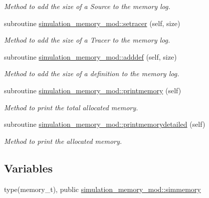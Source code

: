 \begin{DoxyCompactItemize}
\begin{DoxyCompactList}\small\item\em Method to add the size of a Source to the memory log. \end{DoxyCompactList}\item 
subroutine \mbox{\hyperlink{namespacesimulation__memory__mod_a3dfcc0936ad144d609a1b9f9a3a0df6f}{simulation\+\_\+memory\+\_\+mod\+::setracer}} (self, size)
\begin{DoxyCompactList}\small\item\em Method to add the size of a Tracer to the memory log. \end{DoxyCompactList}\item 
subroutine \mbox{\hyperlink{namespacesimulation__memory__mod_ac6d6853bc462947d24a8f6234d625138}{simulation\+\_\+memory\+\_\+mod\+::adddef}} (self, size)
\begin{DoxyCompactList}\small\item\em Method to add the size of a definition to the memory log. \end{DoxyCompactList}\item 
subroutine \mbox{\hyperlink{namespacesimulation__memory__mod_a16a7a1c7e88fe5a5523d23f83f0e04a0}{simulation\+\_\+memory\+\_\+mod\+::printmemory}} (self)
\begin{DoxyCompactList}\small\item\em Method to print the total allocated memory. \end{DoxyCompactList}\item 
subroutine \mbox{\hyperlink{namespacesimulation__memory__mod_a894bd4ec7462fd634d328ee5be4c6483}{simulation\+\_\+memory\+\_\+mod\+::printmemorydetailed}} (self)
\begin{DoxyCompactList}\small\item\em Method to print the allocated memory. \end{DoxyCompactList}\end{DoxyCompactItemize}
\subsection*{Variables}
\begin{DoxyCompactItemize}
\item 
type(memory\+\_\+t), public \mbox{\hyperlink{namespacesimulation__memory__mod_af3e2714796469b4b1ec247569b184088}{simulation\+\_\+memory\+\_\+mod\+::simmemory}}
\end{DoxyCompactItemize}
